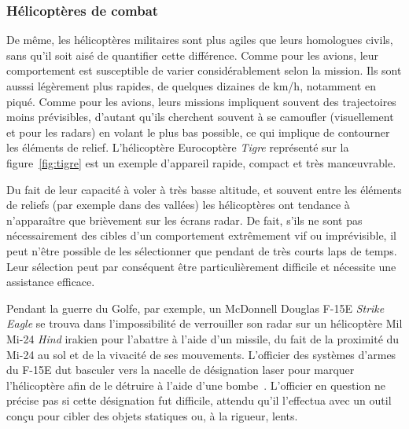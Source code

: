 
	
	\subsubsection{Hélicoptères de combat}
	De même, les hélicoptères militaires sont plus agiles que leurs homologues civils, sans qu'il soit aisé de quantifier cette différence. Comme pour les avions, leur comportement est susceptible de varier considérablement selon la mission. Ils sont ausssi légèrement plus rapides, de quelques dizaines de km/h, notamment en piqué. Comme pour les avions, leurs missions impliquent souvent des trajectoires moins prévisibles, d'autant qu'ils cherchent souvent à se camoufler (visuellement et pour les radars) en volant le plus bas possible, ce qui implique de contourner les éléments de relief. L'hélicoptère Eurocoptère \emph{Tigre} représenté sur la figure~\ref{fig:tigre} est un exemple d'appareil rapide, compact et très manœuvrable.
	
	Du fait de leur capacité à voler à très basse altitude, et souvent entre les éléments de reliefs (par exemple dans des vallées) les hélicoptères ont tendance à n'apparaître que brièvement sur les écrans radar. De fait, s'ils ne sont pas nécessairement des cibles d'un comportement extrêmement vif ou imprévisible, il peut n'être possible de les sélectionner que pendant de très courts laps de temps. Leur sélection peut par conséquent être particulièrement difficile et nécessite une assistance efficace.
	
	Pendant la guerre du Golfe, par exemple, un McDonnell Douglas F-15E \emph{Strike Eagle} se trouva dans l'impossibilité de verrouiller son radar sur un hélicoptère Mil Mi-24 \emph{Hind} irakien pour l'abattre à l'aide d'un missile, du fait de la proximité du Mi-24 au sol et de la vivacité de ses mouvements. L'officier des systèmes d'armes du F-15E dut basculer vers la nacelle de désignation laser pour \og marquer \fg{} l'hélicoptère afin de le détruire à l'aide d'une bombe~\cite{craig2007debrief}. L'officier en question ne précise pas si cette désignation fut difficile, attendu qu'il l'effectua avec un outil conçu pour cibler des objets statiques ou, à la rigueur, lents.
	
